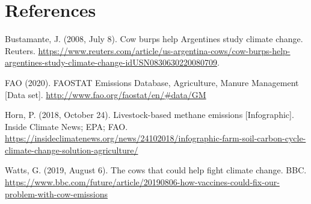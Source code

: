 \documentclass[
  12pt,
]{article}
\begin{document}
\newpage

\hypertarget{references}{%
\section{References}\label{references}}

Bustamante, J. (2008, July 8). Cow burps help Argentines study climate
change. Reuters.
\url{https://www.reuters.com/article/us-argentina-cows/cow-burps-help-argentines-study-climate-change-idUSN0830630220080709}.

FAO (2020). FAOSTAT Emissions Database, Agriculture, Manure Management
{[}Data set{]}. \url{http://www.fao.org/faostat/en/\#data/GM}

Horn, P. (2018, October 24). Livestock-based methane emissions
{[}Infographic{]}. Inside Climate News; EPA; FAO.
\url{https://insideclimatenews.org/news/24102018/infographic-farm-soil-carbon-cycle-climate-change-solution-agriculture/}

Watts, G. (2019, August 6). The cows that could help fight climate
change. BBC.
\url{https://www.bbc.com/future/article/20190806-how-vaccines-could-fix-our-problem-with-cow-emissions}
\end{document}
